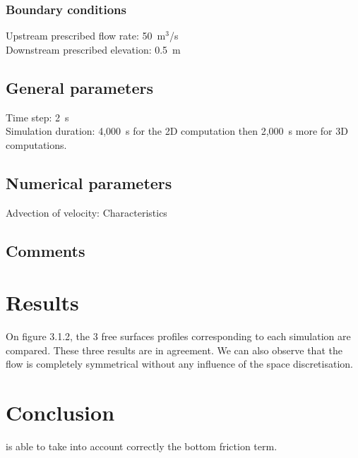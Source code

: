 \subsubsection{Boundary conditions}
%
Upstream prescribed flow rate: 50~m$^3$/s\\
Downstream prescribed elevation: 0.5~m
%
\subsection{General parameters}
%
Time step: 2~s\\
Simulation duration: 4,000~s for the 2D computation then 2,000~s more
for 3D computations.
%
%
%
\subsection{Numerical parameters}
%
Advection of velocity: Characteristics
%
\subsection{Comments}
%
%
%
\section{Results}
%
On figure 3.1.2, the 3 free surfaces profiles corresponding to each
simulation are compared.
These three results are in agreement.
We can also observe that the flow is completely symmetrical without
any influence of the space discretisation.
%
\section{Conclusion}
%
 is able to take into account correctly the bottom friction
term.
%
%
